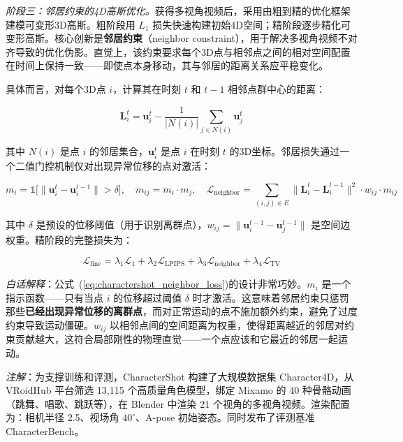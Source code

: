 \textit{阶段三：邻居约束的4D高斯优化。}获得多视角视频后，采用由粗到精的优化框架建模可变形3D高斯。粗阶段用 $L_1$ 损失快速构建初始4D空间；精阶段逐步精化可变形高斯。核心创新是\textbf{邻居约束}（neighbor constraint），用于解决多视角视频不对齐导致的优化伪影。直觉上，该约束要求每个3D点与相邻点之间的相对空间配置在时间上保持一致——即使点本身移动，其与邻居的距离关系应平稳变化。

具体而言，对每个3D点 $i$，计算其在时刻 $t$ 和 $t-1$ 相邻点群中心的距离：

\begin{equation}
\label{eq:charactershot_neighbor_dist}
\mathbf{L}_i^t = \mathbf{u}_i^t - \frac{1}{|N(i)|} \sum_{j \in N(i)} \mathbf{u}_j^t
\end{equation}

其中 $N(i)$ 是点 $i$ 的邻居集合，$\mathbf{u}_i^t$ 是点 $i$ 在时刻 $t$ 的3D坐标。邻居损失通过一个二值门控机制仅对出现异常位移的点对激活：

\begin{equation}
\label{eq:charactershot_neighbor_loss}
m_i = \mathbb{1}\!\big[\|\mathbf{u}_i^t - \mathbf{u}_i^{t-1}\| > \delta\big], \quad m_{ij} = m_i \cdot m_j, \quad \mathcal{L}_{\mathrm{neighbor}} = \sum_{(i,j) \in E} \big\|\mathbf{L}_i^t - \mathbf{L}_i^{t-1}\big\|^2 \cdot w_{ij} \cdot m_{ij}
\end{equation}

其中 $\delta$ 是预设的位移阈值（用于识别离群点），$w_{ij} = \|\mathbf{u}_i^{t-1} - \mathbf{u}_j^{t-1}\|$ 是空间边权重。精阶段的完整损失为：

\begin{equation}
\label{eq:charactershot_fine_loss}
\mathcal{L}_{\mathrm{fine}} = \lambda_1 \mathcal{L}_1 + \lambda_2 \mathcal{L}_{\mathrm{LPIPS}} + \lambda_3 \mathcal{L}_{\mathrm{neighbor}} + \lambda_4 \mathcal{L}_{\mathrm{TV}}
\end{equation}

\textit{白话解释}：公式~(\ref{eq:charactershot_neighbor_loss})的设计非常巧妙。$m_i$ 是一个指示函数——只有当点 $i$ 的位移超过阈值 $\delta$ 时才激活。这意味着邻居约束只惩罚那些\textbf{已经出现异常位移的离群点}，而对正常运动的点不施加额外约束，避免了过度约束导致运动僵硬。$w_{ij}$ 以相邻点间的空间距离为权重，使得距离越近的邻居对约束贡献越大，这符合局部刚性的物理直觉——一个点应该和它最近的邻居一起运动。

\textit{注解}：为支撑训练和评测，CharacterShot 构建了大规模数据集 Character4D，从 VRoidHub 平台筛选 13,115 个高质量角色模型，绑定 Mixamo 的 40 种骨骼动画（跳舞、唱歌、跳跃等），在 Blender 中渲染 21 个视角的多视角视频。渲染配置为：相机半径 2.5、视场角 $40^\circ$、A-pose 初始姿态。同时发布了评测基准 CharacterBench。

